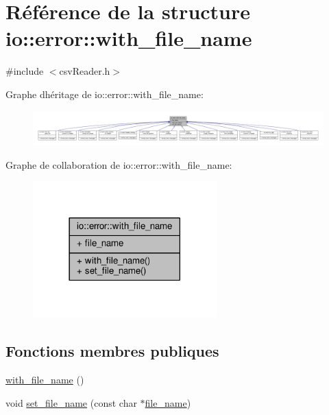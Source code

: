\hypertarget{structio_1_1error_1_1with__file__name}{}\section{Référence de la structure io\+:\+:error\+:\+:with\+\_\+file\+\_\+name}
\label{structio_1_1error_1_1with__file__name}


{\ttfamily \#include $<$csv\+Reader.\+h$>$}



Graphe d\textquotesingle{}héritage de io\+:\+:error\+:\+:with\+\_\+file\+\_\+name\+:
\nopagebreak
\begin{figure}[H]
\begin{center}
\leavevmode
\includegraphics[width=350pt]{structio_1_1error_1_1with__file__name__inherit__graph}
\end{center}
\end{figure}


Graphe de collaboration de io\+:\+:error\+:\+:with\+\_\+file\+\_\+name\+:
\nopagebreak
\begin{figure}[H]
\begin{center}
\leavevmode
\includegraphics[width=201pt]{structio_1_1error_1_1with__file__name__coll__graph}
\end{center}
\end{figure}
\subsection*{Fonctions membres publiques}
\begin{DoxyCompactItemize}
\item 
\hyperlink{structio_1_1error_1_1with__file__name_aeb0eced36b022e8a00b19727d833067f}{with\+\_\+file\+\_\+name} ()
\item 
void \hyperlink{structio_1_1error_1_1with__file__name_ae765de62778c989d4658b4efe2995390}{set\+\_\+file\+\_\+name} (const char $\ast$\hyperlink{structio_1_1error_1_1with__file__name_ac957d5590a8b95517b74eb5bf373a424}{file\+\_\+name})
\end{DoxyCompactItemize}
